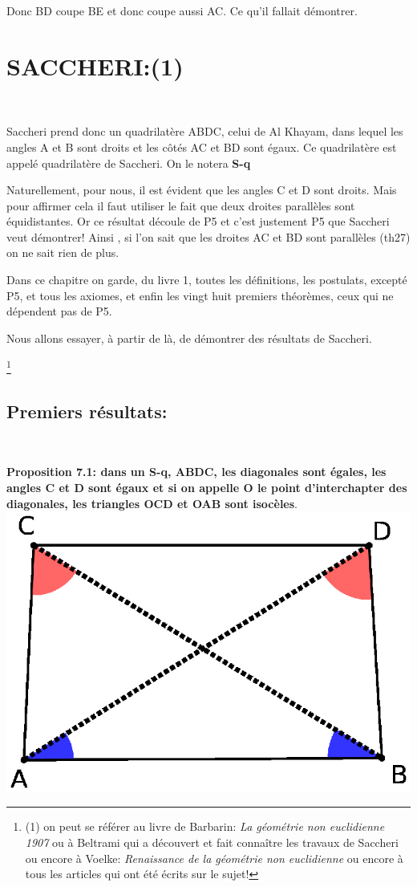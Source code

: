 \documentclass[a4paper, 12pt, twoside]{book}
\begin{document}
  Donc BD coupe BE et donc coupe aussi AC. Ce qu'il fallait démontrer.
  
 
\chapter{SACCHERI:(1)}\
 
 Saccheri prend donc un quadrilatère ABDC, celui de Al Khayam, dans lequel les angles A et B sont droits et les côtés AC et BD sont égaux. Ce quadrilatère est appelé quadrilatère de Saccheri. On le notera \textbf{S-q}\
 
 Naturellement, pour nous, il est évident que les angles C et D sont droits. Mais pour affirmer cela il faut utiliser le fait que deux droites parallèles sont équidistantes. Or ce résultat découle de P5 et c'est justement P5 que Saccheri veut démontrer! Ainsi , si l'on sait que les droites AC et BD sont parallèles (th27) on ne sait rien de plus.\
 
 Dans ce chapitre on garde, du livre 1, toutes les définitions, les postulats, excepté P5, et tous les axiomes, et enfin les vingt huit premiers théorèmes, ceux qui ne dépendent pas de P5.\
 
 Nous allons essayer, à partir de là, de démontrer des résultats de Saccheri.
   
 \footnote{(1) on peut se référer au livre de Barbarin: \textit{La géométrie non euclidienne 1907} ou à  Beltrami qui a découvert et fait connaître les travaux de Saccheri ou encore à Voelke: \textit{Renaissance de la géométrie non euclidienne}  ou encore à tous les articles qui ont été écrits sur le sujet! } 


\newpage \section{Premiers résultats:}\





\textbf{Proposition 7.1: dans un S-q, ABDC, les diagonales sont égales, les angles C et D sont égaux et si on appelle O le point d'interchapter des diagonales, les triangles OCD et OAB sont isocèles}.\\

\includegraphics[scale=0.5]{figures/sacc1.eps}\\
\end{document}
